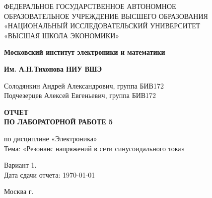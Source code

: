 \begin{titlepage}
	\begin{center}
		ФЕДЕРАЛЬНОЕ  ГОСУДАРСТВЕННОЕ АВТОНОМНОЕ \\
		ОБРАЗОВАТЕЛЬНОЕ УЧРЕЖДЕНИЕ ВЫСШЕГО ОБРАЗОВАНИЯ\\
		«НАЦИОНАЛЬНЫЙ ИССЛЕДОВАТЕЛЬСКИЙ УНИВЕРСИТЕТ\\
		«ВЫСШАЯ ШКОЛА ЭКОНОМИКИ»
	\end{center}
	
	\begin{center}
		\textbf{Московский институт электроники и математики}
		
		\textbf{Им. А.Н.Тихонова НИУ ВШЭ}
	\end{center}
	\vspace{1ex}	
	\begin{center}
		Солодянкин Андрей Александрович, группа БИВ172\\
		Подчезерцев Алексей Евгеньевич, группа БИВ172
	\end{center}	
	\vspace{1ex}
	\begin{center}
		\textbf{ОТЧЕТ\\
		ПО ЛАБОРАТОРНОЙ РАБОТЕ 5
	}
	\end{center}	
	\vspace{2ex}
	\begin{center}
		по дисциплине «Электроника»\\
		Тема: «Резонанс напряжений в сети синусоидального тока»
	\end{center}
	\vspace{2ex}
	\begin{center}
	Вариант 1.\\
	Дата сдачи отчета: \today
	\end{center}
	\vspace{2ex}
	\vfill
	\begin{center}
		Москва \the\year г.
	\end{center}
\end{titlepage}